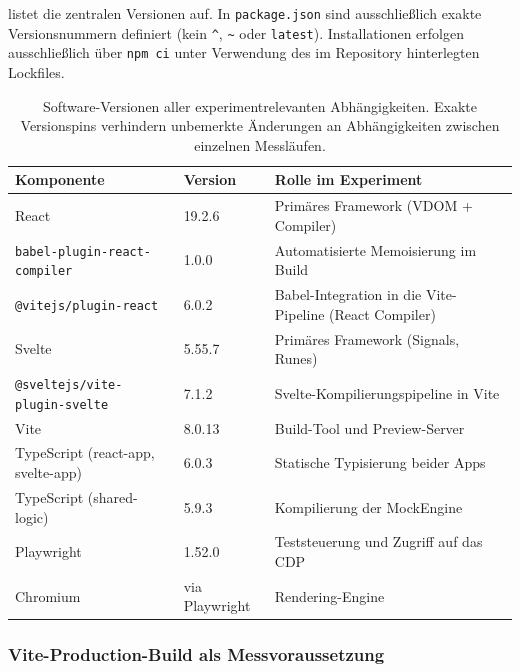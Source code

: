  listet die zentralen Versionen auf. In \texttt{package.json} sind ausschließlich exakte Versionsnummern definiert (kein \texttt{\textasciicircum{}}, \texttt{\textasciitilde{}} oder \texttt{latest}). Installationen erfolgen ausschließlich über \texttt{npm ci} unter Verwendung des im Repository hinterlegten Lockfiles.
\begin{table}[H]
	\centering
	\caption[Fixierte Software-Versionen der Benchmark-Toolchain]{Software-Versionen aller experimentrelevanten Abhängigkeiten. Exakte Versionspins verhindern unbemerkte Änderungen an Abhängigkeiten zwischen einzelnen Messläufen.}
	\label{tab:software-versions}
	\begin{tabular}{ll>{\raggedright\arraybackslash}p{4.5cm}}
		\hline
		Komponente & Version & Rolle im Experiment \\
		\hline
		React                                    & 19.2.6   & Primäres Framework (VDOM + Compiler) \\
		\texttt{babel-plugin-react-compiler}     & 1.0.0    & Automatisierte Memoisierung im Build \\
		\texttt{@vitejs/plugin-react}            & 6.0.2    & Babel-Integration in die Vite-Pipeline (React Compiler) \\ 
        Svelte                                   & 5.55.7   & Primäres Framework (Signals, Runes) \\
		\texttt{@sveltejs/vite-plugin-svelte}    & 7.1.2    & Svelte-Kompilierungspipeline in Vite \\
        Vite                                     & 8.0.13   & Build-Tool und Preview-Server \\
		TypeScript (react-app, svelte-app)       & 6.0.3    & Statische Typisierung beider Apps \\
        TypeScript (shared-logic)                & 5.9.3    & Kompilierung der MockEngine \\
		Playwright                               & 1.52.0   & Teststeuerung und Zugriff auf das CDP \\
		Chromium                                 & via Playwright & Rendering-Engine \\
		\hline
	\end{tabular}
\end{table}

\subsubsection{Vite-Production-Build als Messvoraussetzung}
\label{sss:production-build}

